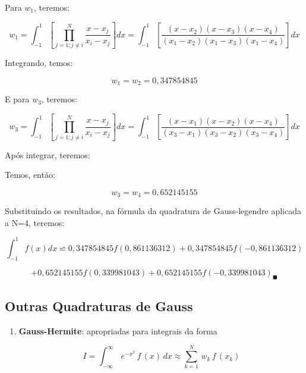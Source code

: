 \begin{enumerate}
\begin{example}
Para $w_{1}$, teremos:

\[
w_{1}=\int_{-1}^{1}\left[\prod_{{\scriptscriptstyle j=1;j\neq i}}^{{\scriptscriptstyle N}}{\scriptstyle \frac{{\scriptstyle x-x_{j}}}{x_{i}-x_{j}}}\right]dx=\int_{-1}^{1}\left[\frac{(x-x_{2})(x-x_{3})(x-x_{4})}{(x_{1}-x_{2})(x_{1}-x_{3})(x_{1}-x_{4})}\right]dx\]


Integrando, temos:

\[
w_{1}=w_{2}=0,347854845\]


E para $w_{3}$, teremos:

\[
w_{3}=\int_{-1}^{1}\left[\prod_{{\scriptscriptstyle j=1;j\neq i}}^{{\scriptscriptstyle N}}{\scriptstyle \frac{{\scriptstyle x-x_{j}}}{x_{i}-x_{j}}}\right]dx=\int_{-1}^{1}\left[\frac{(x-x_{1})(x-x_{2})(x-x_{4})}{(x_{3}-x_{1})(x_{3}-x_{2})(x_{3}-x_{4})}\right]dx\]


Após integrar, teremos:

Temos, então:

\[
w_{3}=w_{4}=0,652145155\]


Substituindo os resultados, na fórmula da quadratura de Gauss-legendre
aplicada a N=4, teremos:

\[
\int_{-1}^{1}{\scriptstyle f(x)dx}\backsimeq0,347854845f(0,861136312)+0,347854845f(-0,861136312)\]


\[
+0,652145155f(0,339981043)+0,652145155f(-0,339981043)_{\blacksquare}\]
\end{example}


\subsection{Outras Quadraturas de Gauss}

\begin{enumerate}

\item 
\textbf{Gauss-Hermite}: apropriadas para integrais da forma

\[
 I = \int_{-\infty}^\infty \, e^{-x^2} \, f\,(x) \, dx \approx \sum_{k=1}^N \, w_k \, f\,(x_k)
\]


\end{enumerate}
\end{enumerate}
